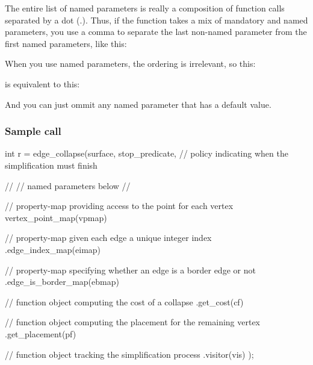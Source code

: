 The entire list of named parameters is really a composition of function calls 
separated by a dot ($.$). Thus, if the function takes a mix of mandatory 
and named parameters, you use a comma to separate the last non-named parameter 
from the first named parameters, like this:


When you use named parameters, the ordering is irrelevant, so this:


is equivalent to this:


And you can just ommit any named parameter that has a default value.

\subsubsection{Sample call}

\begin{cprog}
int r = edge_collapse(surface, 
                      stop_predicate, // policy indicating when the simplification must finish

                      //
                      // named parameters below
                      //
                                              
                      // property-map providing access to the point for each vertex                    
                      vertex_point_map(vpmap)
                      
                      // property-map given each edge a unique integer index
                      .edge_index_map(eimap)
                      
                      // property-map specifying whether an edge is a border edge or not
                      .edge_is_border_map(ebmap)

                      // function object computing the cost of a collapse                     
                      .get_cost(cf)
                      
                      // function object computing the placement for the remaining vertex
                      .get_placement(pf)
                      
                      // function object tracking the simplification process
                      .visitor(vis)
                     );
\end{cprog}



